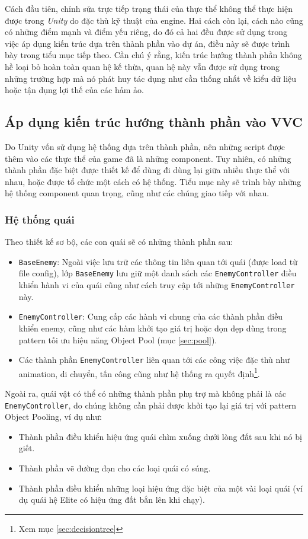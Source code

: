 \documentclass[12pt]{report}
\newcommand{\project}{VVC}
\begin{document}
Cách đầu tiên, chỉnh sửa trực tiếp trạng thái của thực thể không thể thực hiện được trong \textit{Unity} do đặc thù kỹ thuật của engine. Hai cách còn lại, cách nào cũng có những điểm mạnh và điểm yếu riêng, do đó cả hai đều được sử dụng trong việc áp dụng kiến trúc dựa trên thành phần vào dự án, điều này sẽ được trình bày trong tiểu mục tiếp theo. Cần chú ý rằng, kiến trúc hướng thành phần không hề loại bỏ hoàn toàn quan hệ kế thừa, quan hệ này vẫn được sử dụng trong những trường hợp mà nó phát huy tác dụng như cần thống nhất về kiểu dữ liệu hoặc tận dụng lợi thế của các hảm ảo.

\subsection{Áp dụng kiến trúc hướng thành phần vào \project}
Do Unity vốn sử dụng hệ thống dựa trên thành phần, nên những script được thêm vào các thực thể của game đã là những component. Tuy nhiên, có những thành phần đặc biệt được thiết kế để dùng đi dùng lại giữa nhiều thực thể với nhau, hoặc được tổ chức một cách có hệ thống. Tiểu mục này sẽ trình bày những hệ thống component quan trọng, cũng như các chúng giao tiếp với nhau.

\subsubsection{Hệ thống quái}
Theo thiết kế sơ bộ, các con quái sẽ có những thành phần sau:
\begin{itemize}
	\item \texttt{BaseEnemy}: Ngoài việc lưu trữ các thông tin liên quan tới quái (được load từ file config), lớp \texttt{BaseEnemy} lưu giữ một danh sách các \texttt{EnemyController} điều khiển hành vi của quái cũng như cách truy cập tới những \texttt{EnemyController} này.
	\item \texttt{EnemyController}: Cung cấp các hành vi chung của các thành phần điều khiển enemy, cũng như các hàm khởi tạo giá trị hoặc dọn dẹp dùng trong pattern tối ưu hiệu năng Object Pool (mục \ref{sec:pool}).
	\item Các thành phần \texttt{EnemyController} liên quan tới các công việc đặc thù như animation, di chuyển, tấn công cũng như hệ thống ra quyết định\footnote{Xem mục \ref{sec:decisiontree}}.
\end{itemize}

Ngoài ra, quái vật có thể có những thành phần phụ trợ mà không phải là các \texttt{EnemyController}, do chúng không cần phải được khởi tạo lại giá trị với pattern Object Pooling, ví dụ như:
\begin{itemize}
	\item Thành phần điều khiển hiệu ứng quái chìm xuống dưới lòng đất sau khi nó bị giết.
	\item Thành phần vẽ đường đạn cho các loại quái có súng.
	\item Thành phần điều khiển những loại hiệu ứng đặc biệt của một vài loại quái (ví dụ quái hệ Elite có hiệu ứng đất bắn lên khi chạy).
\end{itemize}
\end{document}
